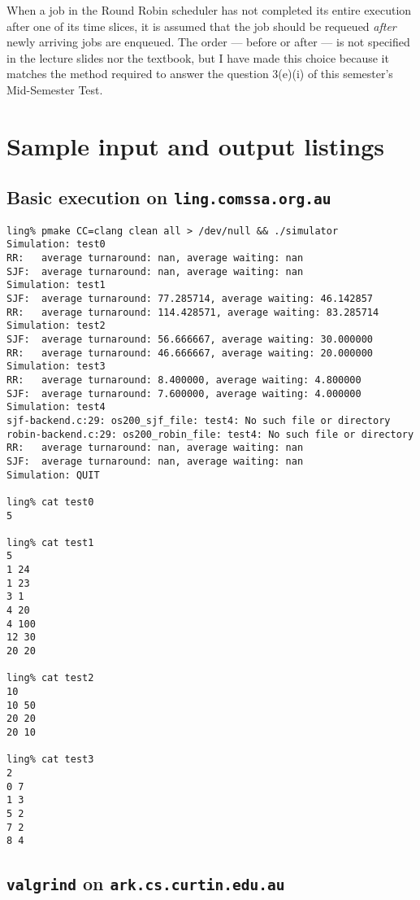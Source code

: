 \documentclass[a4paper,12pt,titlepage]{article}
\begin{document}
When a job in the Round Robin scheduler has not completed its entire execution
after one of its time slices, it is assumed that the job should be requeued
\textit{after} newly arriving jobs are enqueued. The order --- before or after
--- is not specified in the lecture slides nor the textbook, but I have made
this choice because it matches the method required to answer the question
3(e)(i) of this semester's Mid-Semester Test.

\newpage

\section{Sample input and output listings}

\subsection{Basic execution on \texttt{ling.comssa.org.au}}

\begin{lstlisting}
ling% pmake CC=clang clean all > /dev/null && ./simulator
Simulation: test0
RR:   average turnaround: nan, average waiting: nan
SJF:  average turnaround: nan, average waiting: nan
Simulation: test1
SJF:  average turnaround: 77.285714, average waiting: 46.142857
RR:   average turnaround: 114.428571, average waiting: 83.285714
Simulation: test2
SJF:  average turnaround: 56.666667, average waiting: 30.000000
RR:   average turnaround: 46.666667, average waiting: 20.000000
Simulation: test3
RR:   average turnaround: 8.400000, average waiting: 4.800000
SJF:  average turnaround: 7.600000, average waiting: 4.000000
Simulation: test4
sjf-backend.c:29: os200_sjf_file: test4: No such file or directory
robin-backend.c:29: os200_robin_file: test4: No such file or directory
RR:   average turnaround: nan, average waiting: nan
SJF:  average turnaround: nan, average waiting: nan
Simulation: QUIT

ling% cat test0
5

ling% cat test1
5
1 24
1 23
3 1
4 20
4 100
12 30
20 20

ling% cat test2
10
10 50
20 20
20 10

ling% cat test3
2
0 7
1 3
5 2
7 2
8 4
\end{lstlisting}

\newpage

\subsection{\texttt{valgrind} on \texttt{ark.cs.curtin.edu.au}}
\end{document}
